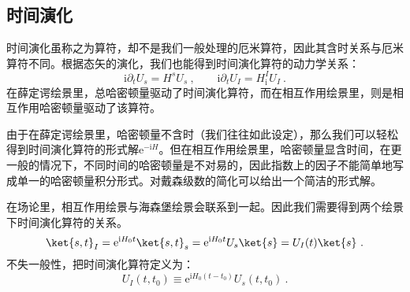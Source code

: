 \subsection{时间演化}
时间演化虽称之为算符，却不是我们一般处理的厄米算符，因此其含时关系与厄米算符不同。根据态矢的演化，我们也能得到时间演化算符的动力学关系：
\begin{equation}
\mathrm{i}\partial_tU_s=H^s U_s~, \qquad
\mathrm{i}\partial_tU_I=H^I_\mathrm{i} U_I~.
\end{equation}
在薛定谔绘景里，总哈密顿量驱动了时间演化算符，而在相互作用绘景里，则是相互作用哈密顿量驱动了该算符。

由于在薛定谔绘景里，哈密顿量不含时（我们往往如此设定），那么我们可以轻松得到时间演化算符的形式解$\mathrm{e}^{-\mathrm{i}H}$。但在相互作用绘景里，哈密顿量显含时间，在更一般的情况下，不同时间的哈密顿量是不对易的，因此指数上的因子不能简单地写成单一的哈密顿量积分形式。对戴森级数的简化可以给出一个简洁的形式解。

在场论里，相互作用绘景与海森堡绘景会联系到一起。因此我们需要得到两个绘景下时间演化算符的关系。
\begin{equation}
\ket{s,t}_I=\mathrm{e} ^{\mathrm{i}H_0t}\ket{s,t}_s=\mathrm{e} ^{\mathrm{i}H_0t}U_s\ket{s}=U_I(t)\ket{s}~.
\end{equation}
不失一般性，把时间演化算符定义为：
\begin{equation}
U_I(t,t_0)\equiv\mathrm{e} ^{\mathrm{i}H_0(t-t_0)}U_s(t,t_0)~.
\end{equation}
